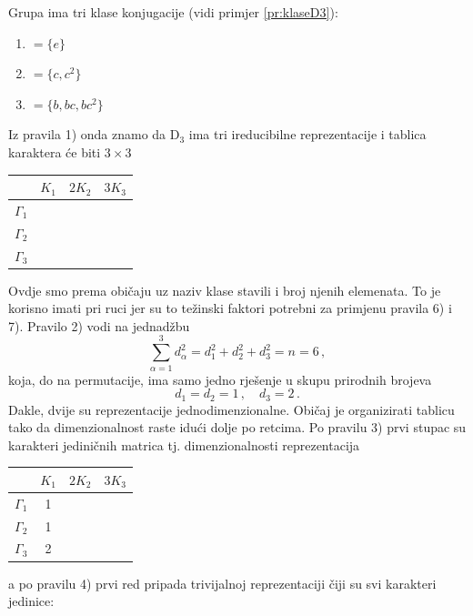 \begin{primjer}
    \label{pr:karakteriD3}  
Grupa ima tri klase konjugacije (vidi primjer \ref{pr:klaseD3}):

\begin{center}
\begin{enumerate}[label=$K_{\mathrm{\arabic{enumi}}}$]
 \item $ = \{e\}$
 \item $ = \{c, c^2\}$
 \item $ =  \{ b, bc, bc^2 \}$
\end{enumerate}
\end{center}

Iz pravila 1) onda znamo da D$_{3}$ ima tri ireducibilne reprezentacije
i tablica karaktera će biti $3 \times 3$
\begin{center}
\begin{tabular}{c|ccc}
  & $K_1$ & $2 K_2$  & $ 3 K_3$ \\ \hline
$\Gamma_1$ &   &  &   \\
$\Gamma_2$ &   &  &   \\
 $\Gamma_3$  &   &  &  
\end{tabular}
\end{center}
Ovdje smo prema običaju uz naziv klase stavili i broj njenih elemenata. To je
korisno imati pri ruci jer su to težinski faktori potrebni za primjenu
pravila 6) i 7).
Pravilo 2) vodi na jednadžbu
 $$\sum_{\alpha=1}^{3} d_{\alpha}^2 = d_{1}^2 + d_{2}^2
   + d_{3}^2 = n = 6 \,, $$
koja, do na permutacije, ima samo jedno rješenje u skupu prirodnih brojeva
 $$ d_1 = d_2 = 1\,,\quad d_3=2 \,. $$
Dakle, dvije su reprezentacije jednodimenzionalne. Običaj je organizirati
tablicu tako da dimenzionalnost raste idući dolje po retcima.
Po pravilu 3) prvi stupac su karakteri jediničnih matrica tj. dimenzionalnosti
reprezentacija
\begin{center}
\begin{tabular}{c|ccc}
  & $K_1$ & $2 K_2$  & $ 3 K_3$ \\ \hline
$\Gamma_1$ & 1 &  &   \\
$\Gamma_2$ & 1 &  &   \\
 $\Gamma_3$  & 2 &  &  
\end{tabular}
\end{center}
a po pravilu 4) prvi red pripada trivijalnoj reprezentaciji čiji su svi karakteri
jedinice:
\begin{center}
\begin{tabular}{c|ccc}

\end{tabular}
\end{center}
\end{primjer}

